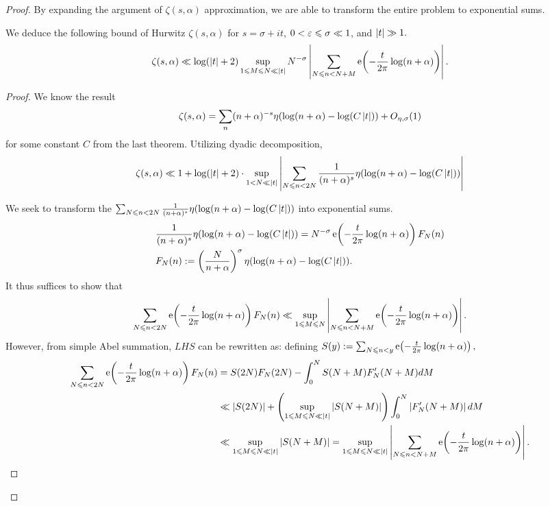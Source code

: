 \begin{proof}
By expanding the argument of $\zeta(s, \alpha)$ approximation, we are able to transform the entire problem to exponential sums.

\begin{theorem}
    We deduce the following bound of Hurwitz $\zeta(s, \alpha)$ for $s = \sigma + it$, $0 < \varepsilon \leqslant \sigma \ll 1$, and $\left\lvert t \right\rvert \gg 1.$
    $$\zeta(s, \alpha) \ll \log(\left\lvert t \right\rvert + 2) \sup_{1 \leqslant M \leqslant N \ll \left\lvert t \right\rvert} N^{-\sigma} \left\lvert \sum_{N \leqslant n < N+M} \operatorname{e} \! \left( - \frac{t}{2\pi} \log(n + \alpha) \right) \right\rvert.$$
\end{theorem}
\begin{proof}
We know the result $$\zeta(s,\alpha) = \sum_n (n+\alpha)^{-s}\eta(\log(n+\alpha)-\log (C \left\lvert t \right\rvert)) + O_{\eta,\sigma}(1)$$ for some constant $C$ from the last theorem. Utilizing dyadic decomposition, 
\begin{equation}
    \zeta(s, \alpha) \ll 1 + \log(\left\lvert t \right\rvert + 2) \cdot \sup_{1 < N \ll \left\lvert t \right\rvert} \left\lvert \sum_{N \leqslant n < 2N} \frac{1}{(n + \alpha)^s} \eta(\log(n+\alpha)-\log (C \left\lvert t \right\rvert)) \right\rvert
\end{equation}

We seek to transform the $\sum_{N \leqslant n < 2N} \frac{1}{(n + \alpha)^s} \eta(\log(n+\alpha)-\log (C \left\lvert t \right\rvert))$ into exponential sums. 
\begin{align*}
    &\frac{1}{(n + \alpha)^s} \eta(\log(n+\alpha)-\log (C \left\lvert t \right\rvert)) = N^{-\sigma} \operatorname{e} \! \left( - \frac{t}{2\pi}\log(n + \alpha) \right) F_N(n) \\
    &F_N(n) := \left( \frac{N}{n + \alpha} \right)^\sigma \eta(\log(n+\alpha)-\log (C \left\lvert t \right\rvert)).
\end{align*}
It thus suffices to show that $$\sum_{N \leqslant n < 2N} \operatorname{e} \! \left( - \frac{t}{2\pi} \log(n + \alpha) \right) F_N(n) \ll \sup_{1 \leqslant M \leqslant N} \left\lvert \sum_{N \leqslant n < N+M} \operatorname{e} \! \left( - \frac{t}{2\pi} \log(n + \alpha) \right) \right\rvert.$$ However, from simple Abel summation, $LHS$ can be rewritten as: defining $S(y) := \sum_{N \leqslant n < y} \operatorname{e} \! \left( - \frac{t}{2\pi} \log(n + \alpha) \right),$
\begin{align*}
    \sum_{N \leqslant n < 2N} \operatorname{e} \! \left( - \frac{t}{2\pi} \log(n + \alpha) \right) F_N(n) &= S(2N)F_N(2N) - \int_0^N S(N+M) F'_N(N + M) dM \\
    &\ll \left\lvert S(2N) \right\rvert + \left( \sup_{1 \leqslant M \leqslant N \ll \left\lvert t \right\rvert} \left\lvert S(N+M) \right\rvert \right) \int_0^N \left\lvert F'_N(N + M) \right\rvert dM \\
    &\ll \sup_{1 \leqslant M \leqslant N \ll \left\lvert t \right\rvert} \left\lvert S(N+M) \right\rvert = \sup_{1 \leqslant M \leqslant N \ll \left\lvert t \right\rvert} \left\lvert \sum_{N \leqslant n < N+M} \operatorname{e} \! \left( - \frac{t}{2\pi} \log(n + \alpha) \right) \right\rvert.
\end{align*}
\end{proof}


\end{proof}
